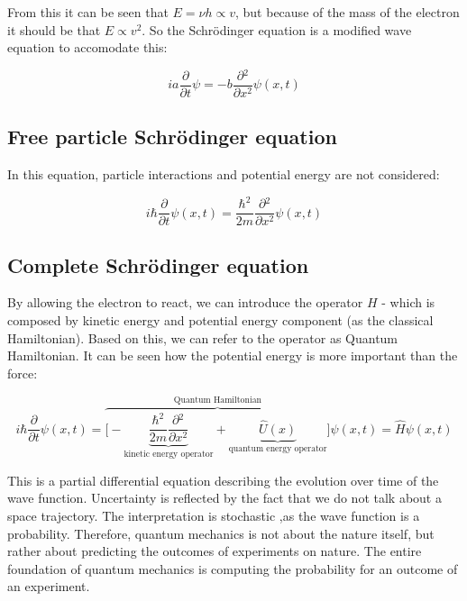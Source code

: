 From this it can be seen that $E=\nu h\propto v$, but because of the mass of the electron it should be that $E\propto v^2$.
So the Schr\"odinger equation is a modified wave equation to accomodate this:

$$ia \frac{\partial {}}{\partial {t}}\psi=-b \frac{\partial {^2}}{\partial {x^2}}\psi(x,t)$$

  \subsection{Free particle Schr\"odinger equation}
  In this equation, particle interactions and potential energy are not considered:

  $$i\hbar \frac{\partial {}}{\partial {t}}\psi(x,t) = \frac{\hbar^2}{2m}\frac{\partial {^2}}{\partial {x^2}}\psi(x,t)$$

  \subsection{Complete Schr\"odinger equation}
  By allowing the electron to react, we can introduce the operator $H$ - which is composed by kinetic energy and potential energy component (as the classical Hamiltonian).
  Based on this, we can refer to the operator as Quantum Hamiltonian.
  It can be seen how the potential energy is more important than the force:

  $$i\hbar \frac{\partial {}}{\partial {t}}\psi(x,t) = \overbrace{\biggl[-\underbrace{\frac{\hbar^2}{2m}\frac{\partial {^2}}{\partial {x^2}}}_{\text{kinetic energy operator}}+\underbrace{\hat{U}(x)}_{\text{quantum energy operator}}\biggr]}^{\text{Quantum Hamiltonian}}\psi(x,t) = \hat{H}\psi(x,t)$$

  This is a partial differential equation describing the evolution over time of the wave function.
  Uncertainty is reflected by the fact that we do not talk about a space trajectory.
  The interpretation is stochastic ,as the wave function is a probability.
  Therefore, quantum mechanics is not about the nature itself, but rather about predicting the outcomes of experiments on nature.
  The entire foundation of quantum mechanics is computing the probability for an outcome of an experiment.
